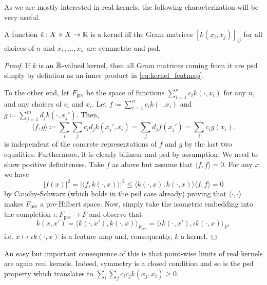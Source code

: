 As we are mostly interested in real kernels, the following 
characterization will be very useful.
\begin{lemma}
    A function $k \colon X \times X \to \mathbb{R}$ is a kernel 
    iff the Gram matrices $[k(x_i,x_j)]_{ij}$ 
    for all choices of $n$ and $x_1, \dots, x_n$
    are symmetric and psd.
\end{lemma}
\begin{proof}
    If $k$ is an $\mathbb{R}$-valued kernel, then all Gram matrices
    coming from it are psd simply by defintion as an inner 
    product in \cref{eq:kernel_featmap}.

    To the other end, let $F_{\textrm{pre}}$ be the
    space of functions $\sum_{i=1}^n c_i k(\cdot,x_i)$ for 
    any $n$, and any choices of $c_i$ and $x_i$.
    Let $f \coloneqq \sum_{i=1}^n c_i k(\cdot,x_i)$ and
    $g \coloneqq \sum_{j=1}^m d_j k(\cdot,x_j')$.
    Then, 
    \begin{equation*}
        \langle f,g \rangle \coloneqq 
            \sum_i \sum_j c_i d_j k(x_j', x_i)
            = \sum_j d_j f(x_j') = \sum_i c_i g(x_i).
    \end{equation*}
    is independent of the concrete representations of $f$ 
    and $g$ by the last two equalities.
    Furthermore, it is clearly bilinear and psd by assumption.
    We need to show positive definiteness. 
    Take $f$ as above but assume that $\langle f,f \rangle = 0$.
    For any $x$ we have 
    \begin{equation} \label{eq:firstreprprop}
        |f(x)|^2 = | \langle f, k(\cdot,x) \rangle |^2
            \leq \langle k(\cdot,x),k(\cdot,x) \rangle
            \langle f,f \rangle = 0
    \end{equation}
    by Cauchy-Schwarz (which holds in the psd case already) 
    proving that $\langle \cdot, \cdot \rangle$ makes 
    $F_{\textrm{pre}}$ a pre-Hilbert space.
    Now, simply take the isometric embedding into the completion 
    $\iota \colon F_{\textrm{pre}} \to F$
    and observe that
    \begin{equation*}
        k(x,x') = 
            \langle k(\cdot,x'), k(\cdot,x) \rangle_{F_{\textrm{pre}}}
            = \langle \iota k(\cdot,x'), \iota k(\cdot,x) \rangle_F,
    \end{equation*}
    i.e. $x \mapsto \iota k(\cdot,x)$ is a feature map and, 
    consequently, $k$ a kernel.
\end{proof}

An easy but important consequence of this is that point-wise limits
of real kernels are again real kernels.
Indeed, symmetry is a closed condition and so is the psd property 
which translates to 
$\sum_i \sum_j c_i c_j k(x_j,x_i) \geq 0$.

